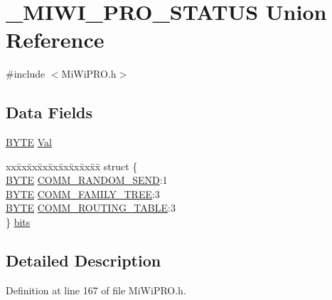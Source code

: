 \hypertarget{union___m_i_w_i___p_r_o___s_t_a_t_u_s}{}\section{\+\_\+\+M\+I\+W\+I\+\_\+\+P\+R\+O\+\_\+\+S\+T\+A\+T\+U\+S Union Reference}
\label{union___m_i_w_i___p_r_o___s_t_a_t_u_s}


{\ttfamily \#include $<$Mi\+Wi\+P\+R\+O.\+h$>$}

\subsection*{Data Fields}
\begin{DoxyCompactItemize}
\item 
\hyperlink{_generic_type_defs_8h_a4ae1dab0fb4b072a66584546209e7d58}{B\+Y\+T\+E} \hyperlink{union___m_i_w_i___p_r_o___s_t_a_t_u_s_a5ab8c2bf45b20b5f7aa3a4f083896cec}{Val}
\item 
\begin{tabbing}
xx\=xx\=xx\=xx\=xx\=xx\=xx\=xx\=xx\=\kill
struct \{\\
\>\hyperlink{_generic_type_defs_8h_a4ae1dab0fb4b072a66584546209e7d58}{BYTE} \hyperlink{union___m_i_w_i___p_r_o___s_t_a_t_u_s_aa28da012de56a82f82274245192112e1}{COMM\_RANDOM\_SEND}:1\\
\>\hyperlink{_generic_type_defs_8h_a4ae1dab0fb4b072a66584546209e7d58}{BYTE} \hyperlink{union___m_i_w_i___p_r_o___s_t_a_t_u_s_ab3bb3f938685c4af8f2665ec0479c5da}{COMM\_FAMILY\_TREE}:3\\
\>\hyperlink{_generic_type_defs_8h_a4ae1dab0fb4b072a66584546209e7d58}{BYTE} \hyperlink{union___m_i_w_i___p_r_o___s_t_a_t_u_s_ae15f8390bee21c2b12b020180d1ac112}{COMM\_ROUTING\_TABLE}:3\\
\} \hyperlink{union___m_i_w_i___p_r_o___s_t_a_t_u_s_afe89d15927c9beb60c5f5e3246cfbd9a}{bits}\\

\end{tabbing}\end{DoxyCompactItemize}


\subsection{Detailed Description}


Definition at line 167 of file Mi\+Wi\+P\+R\+O.\+h.



